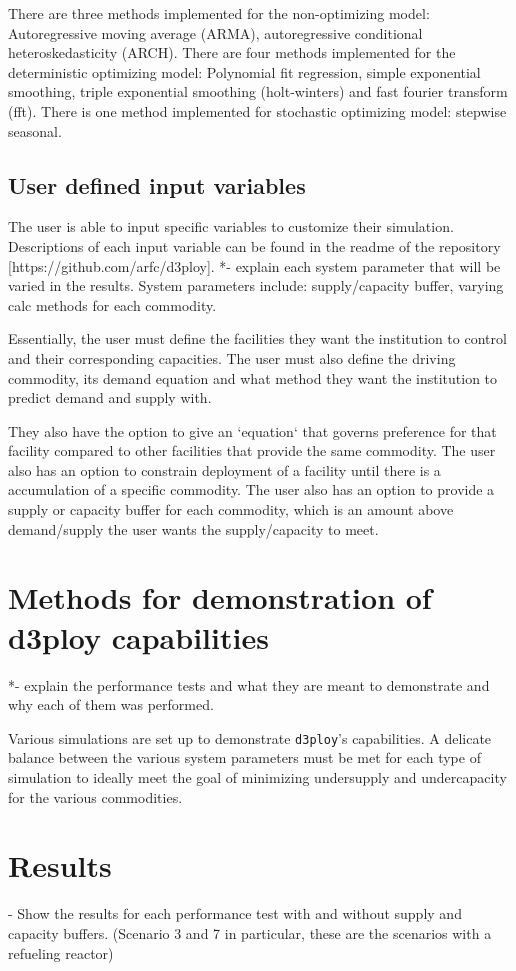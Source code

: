 \documentclass[11pt,letterpaper]{article}
\newcommand{\deploy}{\texttt{d3ploy}\xspace}%
\begin{document}
There are three methods implemented for the non-optimizing model: 
Autoregressive moving average (ARMA), autoregressive 
conditional heteroskedasticity (ARCH).
There are four methods implemented for the deterministic optimizing model: 
Polynomial fit regression, simple exponential smoothing,  
triple exponential smoothing (holt-winters) and fast fourier 
transform (fft). 
There is one method implemented for stochastic optimizing model: 
stepwise seasonal.  

\subsection{User defined input variables}
The user is able to input specific variables to customize their
simulation. 
Descriptions of each input variable can be found in the 
readme of the repository [https://github.com/arfc/d3ploy]. 
*- explain each system parameter that will be varied in the results.
System parameters include: supply/capacity buffer, varying calc 
methods for each commodity.   

Essentially, the user must define the facilities they want the 
institution to control and their corresponding capacities. 
The user must also define the driving commodity, its demand 
equation and what method they want the institution to predict 
demand and supply with. 

They also have the option to give an `equation` that governs
preference for that facility compared to other facilities that 
provide the same commodity. 
The user also has an option to constrain deployment of a facility 
until there is a accumulation of a specific commodity.   
The user also has an option to provide a supply or capacity buffer 
for each commodity, which is an amount above demand/supply the user 
wants the supply/capacity to meet. 

\section{Methods for demonstration of d3ploy capabilities}
*- explain the performance tests and what they are meant to 
demonstrate and why each of them was performed. 

Various simulations are set up to demonstrate \deploy's 
capabilities. 
A delicate balance between the various system parameters must be 
met for each type of simulation to ideally meet the goal of 
minimizing undersupply and undercapacity for the various 
commodities. 

\section{Results}
- Show the results for each performance test with and without 
supply and capacity buffers. (Scenario 3 and 7 in particular, 
these are the scenarios with a refueling reactor)
\end{document}
